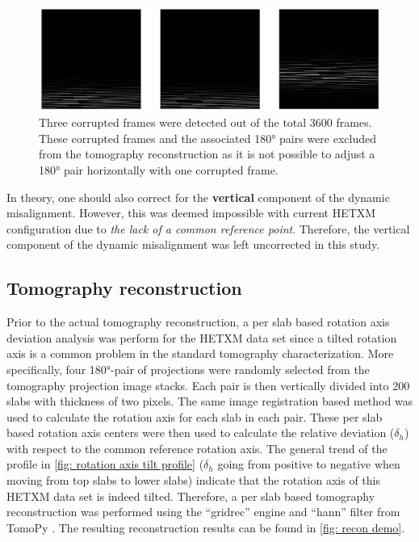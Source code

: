\documentclass[12pt]{scrartcl}
\newcommand{\myscale}{1}
\begin{document}
\renewcommand{\myscale}{0.5}
\begin{figure}[htp]
\centering
\includegraphics[scale=\myscale]{corruptedFrames}
\caption{
Three corrupted frames were detected out of the total 3600 frames.
These corrupted frames and the associated \ang{180} pairs were excluded from the tomography reconstruction as it is not possible to adjust a \ang{180} pair horizontally with one corrupted frame.
}\label{fig: corrupted frames}
\end{figure}

In theory, one should also correct for the \textbf{vertical} component of the dynamic misalignment.
However, this was deemed impossible with current HETXM configuration due to \textit{the lack of a common reference point}.
Therefore, the vertical component of the dynamic misalignment was left uncorrected in this study.


\subsection{Tomography reconstruction}\label{sec: tomo recon}

Prior to the actual tomography reconstruction,  a per slab based rotation axis deviation analysis was perform for the HETXM data set since a tilted rotation axis is a common problem in the standard tomography characterization.
More specifically, four \ang{180}-pair of projections were randomly selected from the tomography projection image stacks.
Each pair is then vertically divided into 200 slabs with thickness of two pixels.
The same image registration based method was used to calculate the rotation axis for each slab in each pair.
These per slab based rotation axis centers were then used to calculate the relative deviation ($\delta_h$) with respect to the common reference rotation axis.
The general trend of the profile in \cref{fig: rotation axis tilt profile} ($\delta_h$ going from positive to negative when moving from top slabs to lower slabs) indicate that the rotation axis of this HETXM data set is indeed tilted.
Therefore, a per slab based tomography reconstruction was performed using the ``gridrec'' engine and ``hann'' filter from TomoPy \citep{Gursoy_etal2014}.
The resulting reconstruction results can be found in \cref{fig: recon demo}. 
\end{document}
